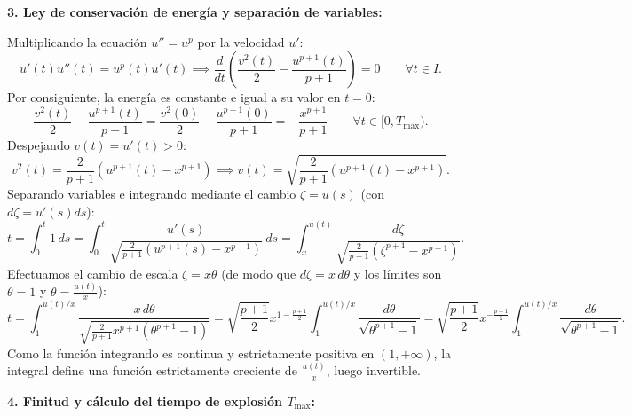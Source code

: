 {\begin{center}
    \end{center}

    \textbf{3. Ley de conservación de energía y separación de variables:}

    Multiplicando la ecuación $u'' = u^p$ por la velocidad $u'$:
    \[
        u'(t) u''(t) = u^p(t) u'(t) \implies \frac{d}{dt} \left( \frac{v^2(t)}{2} - \frac{u^{p+1}(t)}{p+1} \right) = 0 \qquad \forall t \in I.
    \]
    Por consiguiente, la energía es constante e igual a su valor en $t = 0$:
    \[
        \frac{v^2(t)}{2} - \frac{u^{p+1}(t)}{p+1} = \frac{v^2(0)}{2} - \frac{u^{p+1}(0)}{p+1} = - \frac{x^{p+1}}{p+1} \qquad \forall t \in [0, T_{\max}).
    \]
    Despejando $v(t) = u'(t) > 0$:
    \[
        v^2(t) = \frac{2}{p+1} \left( u^{p+1}(t) - x^{p+1} \right) \implies v(t) = \sqrt{\frac{2}{p+1} \left( u^{p+1}(t) - x^{p+1} \right)}.
    \]
    Separando variables e integrando mediante el cambio $\zeta = u(s)$ (con $d\zeta = u'(s) ds$):
    \[
        t = \int_0^t 1 \, ds = \int_0^t \frac{u'(s)}{\sqrt{\frac{2}{p+1} \left( u^{p+1}(s) - x^{p+1} \right)}} \, ds = \int_x^{u(t)} \frac{d\zeta}{\sqrt{\frac{2}{p+1} \left( \zeta^{p+1} - x^{p+1} \right)}}.
    \]
    Efectuamos el cambio de escala $\zeta = x \theta$ (de modo que $d\zeta = x \, d\theta$ y los límites son $\theta = 1$ y $\theta = \frac{u(t)}{x}$):
    \[
        t = \int_1^{u(t)/x} \frac{x \, d\theta}{\sqrt{\frac{2}{p+1} x^{p+1} (\theta^{p+1} - 1)}} = \sqrt{\frac{p+1}{2}} x^{1 - \frac{p+1}{2}} \int_1^{u(t)/x} \frac{d\theta}{\sqrt{\theta^{p+1} - 1}} = \sqrt{\frac{p+1}{2}} x^{-\frac{p-1}{2}} \int_1^{u(t)/x} \frac{d\theta}{\sqrt{\theta^{p+1} - 1}}.
    \]
    Como la función integrando es continua y estrictamente positiva en $(1, +\infty)$, la integral define una función estrictamente creciente de $\frac{u(t)}{x}$, luego invertible.

    \medskip

    \textbf{4. Finitud y cálculo del tiempo de explosión $T_{\max}$:}

}
